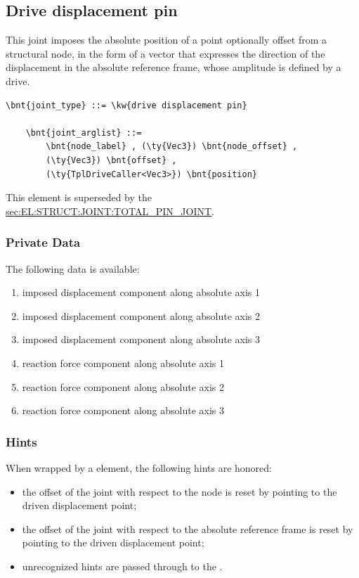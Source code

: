 \subsection{Drive displacement pin}
\label{sec:EL:JOINT:DRIVEDISPLACEMENTPIN}
This joint imposes the absolute position of a point optionally offset
from a structural node, in the form of a vector that expresses 
the direction of the displacement in the absolute reference frame,
whose amplitude is defined by a drive.
\begin{Verbatim}[commandchars=\\\{\}]
    \bnt{joint_type} ::= \kw{drive displacement pin}

    \bnt{joint_arglist} ::= 
        \bnt{node_label} , (\ty{Vec3}) \bnt{node_offset} ,
        (\ty{Vec3}) \bnt{offset} ,
        (\ty{TplDriveCaller<Vec3>}) \bnt{position}
\end{Verbatim}
This element is superseded by the
\hyperref{\kw{total pin joint}}{\kw{total pin joint}, see Section~}{}{sec:EL:STRUCT:JOINT:TOTAL_PIN_JOINT}.

\subsubsection{Private Data}
The following data is available:
\begin{enumerate}
\item {} imposed displacement component along absolute axis 1
\item {} imposed displacement component along absolute axis 2
\item {} imposed displacement component along absolute axis 3
\item {} reaction force component along absolute axis 1
\item {} reaction force component along absolute axis 2
\item {} reaction force component along absolute axis 3
\end{enumerate}

\subsubsection{Hints}
When wrapped by a  element, the following hints are honored:
\begin{itemize}
\item {} the offset of the joint
with respect to the node is reset by pointing 
to the driven displacement point;
\item {} the offset of the joint
with respect to the absolute reference frame is reset by pointing
to the driven displacement point;
\item unrecognized hints are passed through to the .
\end{itemize}



